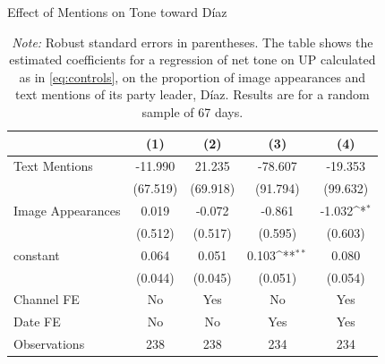 \documentclass[12pt]{article}
\begin{document}
	
	\begin{table}[!htb]\centering
		\def\sym#1{\ifmmode^{#1}\else\(^{#1}\)\fi}
		\caption{Effect of Mentions on Tone toward Díaz}
		\begin{tabular}{l*{4}{c}}
			\hline\hline
			&\multicolumn{1}{c}{(1)}         &\multicolumn{1}{c}{(2)}         &\multicolumn{1}{c}{(3)}         &\multicolumn{1}{c}{(4)}         \\
			\hline
			Text Mentions   &  -11.990         &   21.235         &  -78.607         &  -19.353         \\
			& (67.519)         & (69.918)         & (91.794)         & (99.632)         \\
			Image Appearances  &    0.019         &   -0.072         &   -0.861         &   -1.032\sym{*}  \\
			&  (0.512)         &  (0.517)         &  (0.595)         &  (0.603)         \\
			constant          &    0.064         &    0.051         &    0.103\sym{**} &    0.080         \\
			&  (0.044)         &  (0.045)         &  (0.051)         &  (0.054)         \\
			Channel FE      &       No         &      Yes         &       No         &      Yes         \\
			Date FE         &       No         &       No         &      Yes         &      Yes         \\
			\hline
			Observations    &      238         &      238         &      234         &      234         \\
			\hline\hline
		\end{tabular}
		\label{tab:diaz_images}
		\vspace{0.5em}
		\caption*{\scriptsize\emph{Note:} Robust standard errors in parentheses. The table shows the estimated coefficients for a regression of net tone on UP calculated as in \ref{eq:controls}, on the proportion of image appearances and text mentions of its party leader, Díaz. Results are for a random sample of 67 days. }
	\end{table}
	
\end{document}
